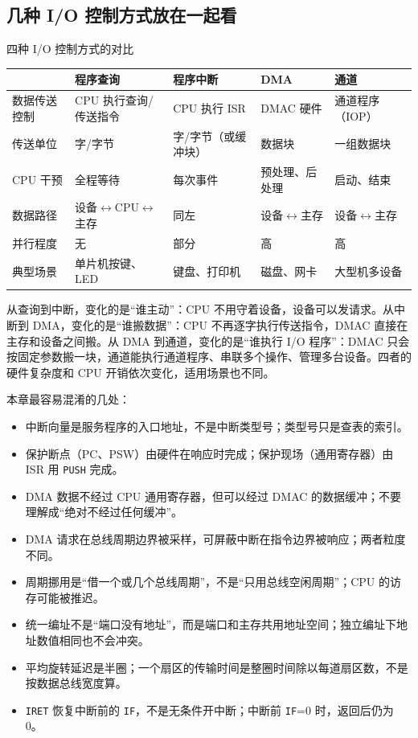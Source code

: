 \subsection{几种 I/O 控制方式放在一起看}

\begin{tablebox}{四种 I/O 控制方式的对比}
\centering
\small
\begin{tabularx}{\linewidth}{|p{2.0cm}|X|X|X|X|}
\hline
 & 程序查询 & 程序中断 & DMA & 通道 \\
\hline
数据传送控制 & CPU 执行查询/传送指令 & CPU 执行 ISR & DMAC 硬件 & 通道程序（IOP） \\
传送单位 & 字/字节 & 字/字节（或缓冲块） & 数据块 & 一组数据块 \\
CPU 干预 & 全程等待 & 每次事件 & 预处理、后处理 & 启动、结束 \\
数据路径 & 设备$\leftrightarrow$CPU$\leftrightarrow$主存 & 同左 & 设备$\leftrightarrow$主存 & 设备$\leftrightarrow$主存 \\
并行程度 & 无 & 部分 & 高 & 高 \\
典型场景 & 单片机按键、LED & 键盘、打印机 & 磁盘、网卡 & 大型机多设备 \\
\hline
\end{tabularx}
\end{tablebox}

从查询到中断，变化的是“谁主动”：CPU 不用守着设备，设备可以发请求。从中断到 DMA，变化的是“谁搬数据”：CPU 不再逐字执行传送指令，DMAC 直接在主存和设备之间搬。从 DMA 到通道，变化的是“谁执行 I/O 程序”：DMAC 只会按固定参数搬一块，通道能执行通道程序、串联多个操作、管理多台设备。四者的硬件复杂度和 CPU 开销依次变化，适用场景也不同。

\begin{attention}
本章最容易混淆的几处：
\begin{itemize}
  \item 中断向量是服务程序的入口地址，不是中断类型号；类型号只是查表的索引。
  \item 保护断点（PC、PSW）由硬件在响应时完成；保护现场（通用寄存器）由 ISR 用 \texttt{PUSH} 完成。
  \item DMA 数据不经过 CPU 通用寄存器，但可以经过 DMAC 的数据缓冲；不要理解成“绝对不经过任何缓冲”。
  \item DMA 请求在总线周期边界被采样，可屏蔽中断在指令边界被响应；两者粒度不同。
  \item 周期挪用是“借一个或几个总线周期”，不是“只用总线空闲周期”；CPU 的访存可能被推迟。
  \item 统一编址不是“端口没有地址”，而是端口和主存共用地址空间；独立编址下地址数值相同也不会冲突。
  \item 平均旋转延迟是半圈；一个扇区的传输时间是整圈时间除以每道扇区数，不是按数据总线宽度算。
  \item \texttt{IRET} 恢复中断前的 \texttt{IF}，不是无条件开中断；中断前 \texttt{IF}=0 时，返回后仍为 0。
\end{itemize}
\end{attention}

\newpage

